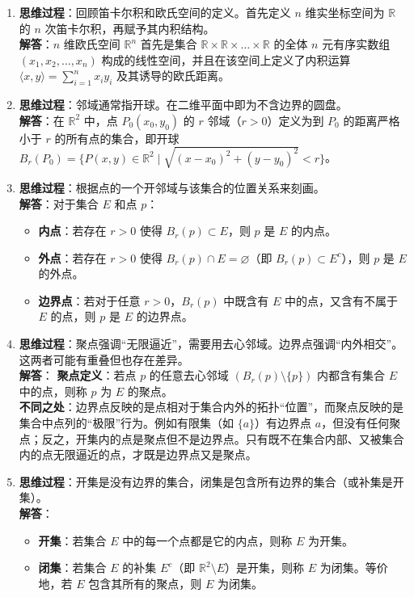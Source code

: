\documentclass[lang=cn,11pt]{elegantbook}
\begin{document}
\begin{solution}
\begin{enumerate}
  \item[(1)] \textbf{思维过程}：回顾笛卡尔积和欧氏空间的定义。首先定义 $n$ 维实坐标空间为 $\mathbb R$ 的 $n$ 次笛卡尔积，再赋予其内积结构。\\
  \textbf{解答}：$n$ 维欧氏空间 $\mathbb{R}^n$ 首先是集合 $\mathbb{R} \times \mathbb{R} \times \dots \times \mathbb{R}$ 的全体 $n$ 元有序实数组 $(x_1, x_2, \dots, x_n)$ 构成的线性空间，并且在该空间上定义了内积运算 $\langle x,y \rangle = \sum_{i=1}^n x_i y_i$ 及其诱导的欧氏距离。

  \item[(2)] \textbf{思维过程}：邻域通常指开球。在二维平面中即为不含边界的圆盘。\\
  \textbf{解答}：在 $\mathbb{R}^2$ 中，点 $P_0(x_0,y_0)$ 的 $r$ 邻域（$r>0$）定义为到 $P_0$ 的距离严格小于 $r$ 的所有点的集合，即开球 $B_r(P_0) = \{P(x,y) \in \mathbb{R}^2 \mid \sqrt{(x-x_0)^2+(y-y_0)^2} < r\}$。

  \item[(3)] \textbf{思维过程}：根据点的一个开邻域与该集合的位置关系来刻画。\\
  \textbf{解答}：对于集合 $E$ 和点 $p$：
  \begin{itemize}
    \item \textbf{内点}：若存在 $r>0$ 使得 $B_r(p) \subset E$，则 $p$ 是 $E$ 的内点。
    \item \textbf{外点}：若存在 $r>0$ 使得 $B_r(p) \cap E = \varnothing$（即 $B_r(p) \subset E^c$），则 $p$ 是 $E$ 的外点。
    \item \textbf{边界点}：若对于任意 $r>0$，$B_r(p)$ 中既含有 $E$ 中的点，又含有不属于 $E$ 的点，则 $p$ 是 $E$ 的边界点。
  \end{itemize}

  \item[(4)] \textbf{思维过程}：聚点强调“无限逼近”，需要用去心邻域。边界点强调“内外相交”。这两者可能有重叠但也存在差异。\\
  \textbf{解答}：
  \textbf{聚点定义}：若点 $p$ 的任意去心邻域 $(B_r(p) \setminus \{p\})$ 内都含有集合 $E$ 中的点，则称 $p$ 为 $E$ 的聚点。\\
  \textbf{不同之处}：边界点反映的是点相对于集合内外的拓扑“位置”，而聚点反映的是集合中点列的“极限”行为。例如有限集（如 $\{a\}$）有边界点 $a$，但没有任何聚点；反之，开集内的点是聚点但不是边界点。只有既不在集合内部、又被集合内的点无限逼近的点，才既是边界点又是聚点。

  \item[(5)] \textbf{思维过程}：开集是没有边界的集合，闭集是包含所有边界的集合（或补集是开集）。\\
  \textbf{解答}：
  \begin{itemize}
    \item \textbf{开集}：若集合 $E$ 中的每一个点都是它的内点，则称 $E$ 为开集。
    \item \textbf{闭集}：若集合 $E$ 的补集 $E^c$（即 $\mathbb{R}^2 \setminus E$）是开集，则称 $E$ 为闭集。等价地，若 $E$ 包含其所有的聚点，则 $E$ 为闭集。
  \end{itemize}


\end{enumerate}
\end{solution}
\end{document}
